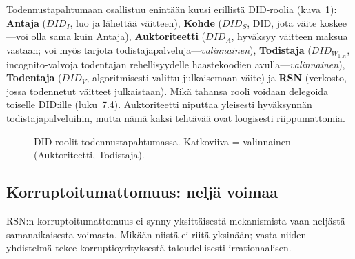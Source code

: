 \documentclass[11pt,a4paper,twocolumn]{article}
\begin{document}
Todennustapahtumaan osallistuu enintään kuusi erillistä DID-roolia (kuva~\ref{fig:roles}): \textbf{Antaja} ($DID_I$, luo ja lähettää väitteen), \textbf{Kohde} ($DID_S$, DID, jota väite koskee---voi olla sama kuin Antaja), \textbf{Auktoriteetti} ($DID_A$, hyväksyy väitteen maksua vastaan; voi myös tarjota todistajapalveluja---\emph{valinnainen}), \textbf{Todistaja} ($DID_{W_{1..n}}$, incognito-valvoja todentajan rehellisyydelle haastekoodien avulla---\emph{valinnainen}), \textbf{Todentaja} ($DID_V$, algoritmisesti valittu julkaisemaan väite) ja \textbf{RSN} (verkosto, jossa todennetut väitteet julkaistaan). Mikä tahansa rooli voidaan delegoida toiselle DID:ille (luku~7.4). Auktoriteetti niputtaa yleisesti hyväksynnän todistajapalveluihin, mutta nämä kaksi tehtävää ovat loogisesti riippumattomia.

\begin{figure}[ht]
\centering
{}
\caption{DID-roolit todennustapahtumassa. Katkoviiva = valinnainen (Auktoriteetti, Todistaja).}
\label{fig:roles}
\end{figure}

\subsection{Korruptoitumattomuus: neljä voimaa}

RSN:n korruptoitumattomuus ei synny yksittäisestä mekanismista vaan neljästä samanaikaisesta voimasta. Mikään niistä ei riitä yksinään; vasta niiden yhdistelmä tekee korruptioyrityksestä taloudellisesti irrationaalisen.
\end{document}
